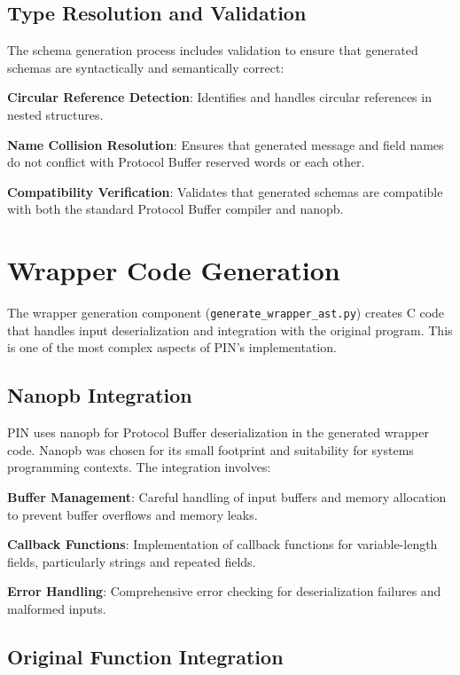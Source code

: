 \documentclass[doublespace,nopageskip]{VTthesis} %
\begin{document}
	\subsection{Type Resolution and Validation}
	
	The schema generation process includes validation to ensure that generated schemas are syntactically and semantically correct:
	
	\textbf{Circular Reference Detection}: Identifies and handles circular references in nested structures.
	
	\textbf{Name Collision Resolution}: Ensures that generated message and field names do not conflict with Protocol Buffer reserved words or each other.
	
	\textbf{Compatibility Verification}: Validates that generated schemas are compatible with both the standard Protocol Buffer compiler and nanopb.
	
	\section{Wrapper Code Generation} \label{se:wrapper_generation}
	
	The wrapper generation component (\texttt{generate\_wrapper\_ast.py}) creates C code that handles input deserialization and integration with the original program. This is one of the most complex aspects of PIN's implementation.
	
	\subsection{Nanopb Integration}
	
	PIN uses nanopb \citep{nanopb2024} for Protocol Buffer deserialization in the generated wrapper code. Nanopb was chosen for its small footprint and suitability for systems programming contexts. The integration involves:
	
	\textbf{Buffer Management}: Careful handling of input buffers and memory allocation to prevent buffer overflows and memory leaks.
	
	\textbf{Callback Functions}: Implementation of callback functions for variable-length fields, particularly strings and repeated fields.
	
	\textbf{Error Handling}: Comprehensive error checking for deserialization failures and malformed inputs.
	
\subsection{Original Function Integration}
\end{document}
